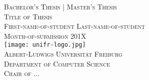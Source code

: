\begin{titlepage}
\begin{center}
	\vspace{6em}
	{\Large \textsc{Bachelor's Thesis | Master's Thesis}}\\
	\vspace{5em}
	{\huge \textsc{Title of Thesis}}\\
	\vspace{4em}
	{\Large \textsc{First-name-of-student Last-name-of-student}}\\
	\vspace{3em}
	{\Large \textsc{Month-of-submission 201X}}\\
	\vspace{4em}
	\texttt{[image: unifr-logo.jpg]}\\
	\vspace{4em}
	{\Large \textsc{Albert-Ludwigs Universität Freiburg}}\\
	\vspace{1em}
	{\Large \textsc{Department of Computer Science}}\\
	\vspace{1em}
	{\Large \textsc{Chair of ...}}\\
\end{center}
\end{titlepage}